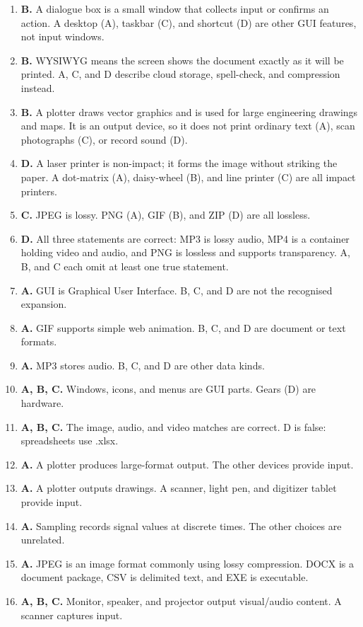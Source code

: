 \begin{enumerate}[label=\textbf{Q\arabic*.}, leftmargin=*]
  correct elements with wrong ones.
\item \textbf{B.} A dialogue box is a small window that collects input or
  confirms an action. A desktop (A), taskbar (C), and shortcut (D) are other
  GUI features, not input windows.
\item \textbf{B.} WYSIWYG means the screen shows the document exactly as it
  will be printed. A, C, and D describe cloud storage, spell-check, and
  compression instead.
\item \textbf{B.} A plotter draws vector graphics and is used for large
  engineering drawings and maps. It is an output device, so it does not print
  ordinary text (A), scan photographs (C), or record sound (D).
\item \textbf{D.} A laser printer is non-impact; it forms the image without
  striking the paper. A dot-matrix (A), daisy-wheel (B), and line printer (C)
  are all impact printers.
\item \textbf{C.} JPEG is lossy. PNG (A), GIF (B), and ZIP (D) are all
  lossless.
\item \textbf{D.} All three statements are correct: MP3 is lossy audio, MP4 is
  a container holding video and audio, and PNG is lossless and supports
  transparency. A, B, and C each omit at least one true statement.

\item \textbf{A.} GUI is Graphical User Interface. B, C, and D are not the recognised expansion.
\item \textbf{A.} GIF supports simple web animation. B, C, and D are document or text formats.
\item \textbf{A.} MP3 stores audio. B, C, and D are other data kinds.
\item \textbf{A, B, C.} Windows, icons, and menus are GUI parts. Gears (D) are hardware.
\item \textbf{A, B, C.} The image, audio, and video matches are correct. D is false: spreadsheets use .xlsx.
\item \textbf{A.} A plotter produces large-format output. The other devices provide input.

\item \textbf{A.} A plotter outputs drawings. A scanner, light pen, and digitizer tablet provide input.

\item \textbf{A.} Sampling records signal values at discrete times. The other choices are unrelated.

\item \textbf{A.} JPEG is an image format commonly using lossy compression. DOCX is a document package, CSV is delimited text, and EXE is executable.

\item \textbf{A, B, C.} Monitor, speaker, and projector output visual/audio content. A scanner captures input.

\end{enumerate}
